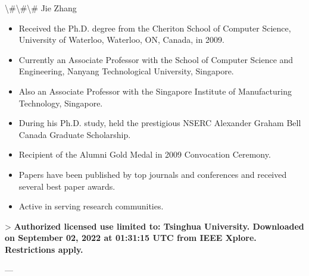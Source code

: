 \documentclass{article}
\begin{document}
	\textbackslash{}#\textbackslash{}#\textbackslash{}# Jie Zhang
	
	\begin{itemize}
		\item Received the Ph.D. degree from the Cheriton School of Computer Science, University of Waterloo, Waterloo, ON, Canada, in 2009.
		\item Currently an Associate Professor with the School of Computer Science and Engineering, Nanyang Technological University, Singapore.
		\item Also an Associate Professor with the Singapore Institute of Manufacturing Technology, Singapore.
		\item During his Ph.D. study, held the prestigious NSERC Alexander Graham Bell Canada Graduate Scholarship.
		\item Recipient of the Alumni Gold Medal in 2009 Convocation Ceremony.
		\item Papers have been published by top journals and conferences and received several best paper awards.
		\item Active in serving research communities.
	\end{itemize}
	
	> \textbf{Authorized licensed use limited to: Tsinghua University. Downloaded on September 02, 2022 at 01:31:15 UTC from IEEE Xplore. Restrictions apply.}
	
	---
	
	
	
\end{document}
